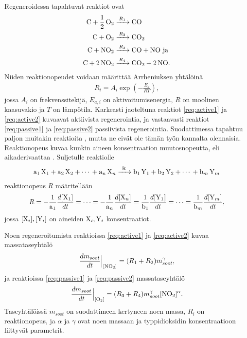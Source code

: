 Regeneroidessa tapahtuvat reaktiot ovat  
\begin{align}
    \ce{C + 1/2 O2 &->[$R_1$] CO }\label{req:active1}\\
    \ce{C + O2 &->[$R_2$] CO2}\label{req:active2}\\
    \ce{C + NO2 &->[$R_3$] CO +  NO} \text{ ja }  \label{req:passive1} \\
    \ce{C + 2 NO2 &->[$R_4$] CO2 + 2 NO}. \label{req:passive2}
\end{align}
Niiden reaktionopeudet voidaan määrittää Arrheniuksen yhtälöinä \cite{LiuGuanlin2021Roio} \cite{Penghao_regen}
\begin{align}
    R_i =  A_i \exp\left({-\frac{E_a}{RT}}\right),
\end{align}
jossa \(A_i\) on frekvenssitekijä, \(E_{a, i}\) on aktivoitumisenergia, \(R\) on moolinen kaasuvakio ja \(T\) on lämpötila. Karkeasti jaoteltuna reaktiot \eqref{req:active1} ja \eqref{req:active2} kuvaavat aktiivista regenerointia, ja vastaavasti reaktiot \eqref{req:passive1} ja \eqref{req:passive2} passiivista regenerointia.
Suodattimessa tapahtuu paljon muitakin reaktioita \cite{Penghao_regen}, mutta ne eivät ole tämän työn kannalta olennaisia.
Reaktionopeus kuvaa kunkin aineen konsentraation muutosnopeutta, eli aikaderivaattaa \cite[s. 24-26]{chemical_reaction_kinetics}. Suljetulle reaktiolle
\begin{align}
    \ce{a1 X1 + a2 X2 + \cdots {} + a_n X_n ->[R] b1 Y1 + b2 Y2 + \cdots {} + b_m Y_m}
\end{align}
reaktionopeus \(R\) määritellään
\begin{align}
    R   = -\frac{1}{\ce{a1}}\frac{d[\ce{X1}]}{dt} 
        = \cdots 
        = -\frac{1}{\ce{a_n}}\frac{d[\ce{X_n}]}{dt}
        = \frac{1}{\ce{b1}}\frac{d[\ce{Y1}]}{dt} 
        = \cdots 
        = \frac{1}{\ce{b_m}}\frac{d[\ce{Y_m}]}{dt},
\end{align}
jossa \(\ce{[X_i], [Y_i]}\) on aineiden \(\ce{X_i, Y_i}\) konsentraatiot. 

Noen regeneroitumista reaktioissa \eqref{req:active1} ja \eqref{req:active2} kuvaa massataseyhtälö \cite{BaiShuzhan2016Slem} \cite{ZhongChao2022Eaos}
\begin{align}
    \frac{d m_{soot}}{dt}\Big |_{[\ce{NO2}]} = (R_1 + R_2) m_{soot}^\gamma,
\end{align}
ja reaktioissa \eqref{req:passive1} ja \eqref{req:passive2} massataseyhtälö 
\begin{align}
    \frac{d m_{soot}}{dt}\Big |_{[\ce{O2}]} = (R_3 + R_4) m_{soot}^\gamma [\ce{NO2}]^\alpha.
\end{align}
Taseyhtälöissä \(m_{soot}\) on suodattimeen kertyneen noen massa, \(R_i\) on reaktionopeus, ja \(\alpha\) ja \(\gamma\) ovat noen massaan ja typpidioksidin konsentraatioon liittyvät parametrit.



